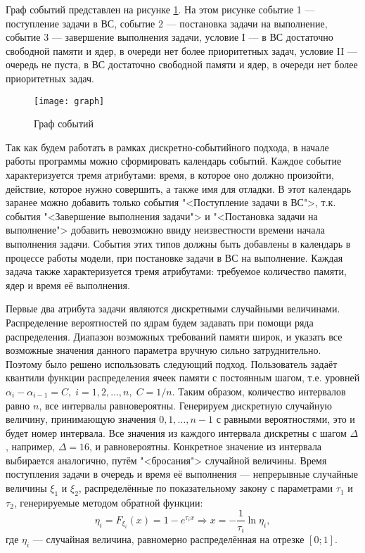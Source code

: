 \documentclass[russian, 14pt, a4paper]{extreport}
\begin{document}
Граф событий представлен на рисунке \ref{fig:graph}. На этом рисунке событие 1 --- поступление задачи в ВС, событие 2 --- постановка задачи на выполнение, событие 3 --- завершение выполнения задачи, условие I --- в ВС достаточно свободной памяти и ядер, в очереди нет более приоритетных задач, условие II --- очередь не пуста, в ВС достаточно свободной памяти и ядер, в очереди нет более приоритетных задач.
\begin{figure}
  \centering
  \texttt{[image: graph]}
  \caption{Граф событий}
  \label{fig:graph}
\end{figure}

Так как будем работать в рамках дискретно-событийного подхода, в начале работы программы можно сформировать календарь событий. Каждое событие характеризуется тремя атрибутами: время, в которое оно должно произойти, действие, которое нужно совершить, а также имя для отладки. В этот календарь заранее можно добавить только события "<Поступление задачи в ВС">, т.к. события "<Завершение выполнения задачи"> и "<Постановка задачи на выполнение"> добавить невозможно ввиду неизвестности времени начала выполнения задачи. События этих типов должны быть добавлены в календарь в процессе работы модели, при постановке задачи в ВС на выполнение. Каждая задача также характеризуется тремя атрибутами: требуемое количество памяти, ядер и время её выполнения.

Первые два атрибута задачи являются дискретными случайными величинами. Распределение вероятностей по ядрам будем задавать при помощи ряда распределения. Диапазон возможных требований памяти широк, и указать все возможные значения данного параметра вручную сильно затруднительно. Поэтому было решено использовать следующий подход. Пользователь задаёт квантили функции распределения ячеек памяти с постоянным шагом, т.е. уровней \(\alpha_{i} - \alpha_{i - 1} = C,\;i = 1, 2, \ldots, n,\;C = 1/n\). Таким образом, количество интервалов равно \(n\), все интервалы равновероятны. Генерируем дискретную случайную величину, принимающую значения \(0, 1, \ldots, n-1\) с равными вероятностями, это и будет номер интервала. Все значения из каждого интервала дискретны с шагом \(\Delta\), например, \(\Delta = 16\), и равновероятны. Конкретное значение из интервала выбирается аналогично, путём "<бросания"> случайной величины. Время поступления задачи в очередь и время её выполнения --- непрерывные случайные величины \(\xi_{1}\) и \(\xi_{2}\), распределённые по показательному закону с параметрами \(\tau_{1}\) и \(\tau_{2}\), генерируемые методом обратной функции:
\[\eta_{i} = F_{\xi_{i}}(x) = 1 - e^{\tau_{i}x} \Rightarrow x = -\dfrac{1}{\tau_{i}}\ln \eta_{i},\]
где \(\eta_{i}\) --- случайная величина, равномерно распределённая на отрезке \([0;1]\).
\end{document}
